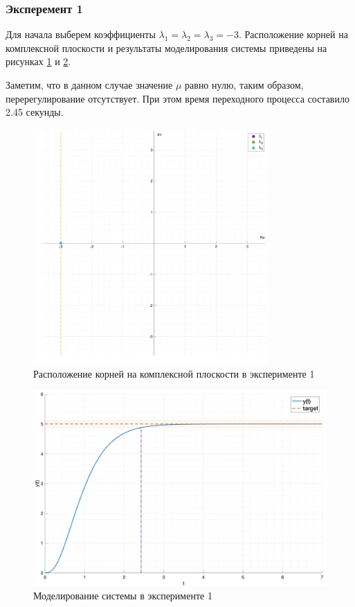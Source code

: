 \subsubsection{Эксперемент 1}
\label{task2_case1}

Для начала выберем коэффициенты $\lambda_1 = \lambda_2 = \lambda_3 = -3$. Расположение корней 
на комплексной плоскости и результаты моделирования системы приведены на 
рисунках \ref{fig:task_2_points1} и \ref{fig:task_2_case1}. 

Заметим, что в данном случае значение $\mu$ равно нулю, таким образом, перерегулирование
отсутствует. При этом время переходного процесса составило 2.45 секунды.

\begin{figure}
    \centering
    \includegraphics[width=0.8\textwidth]{media/plots/task2_points1.png}
    \caption{Расположение корней на комплексной плоскости в эксперименте 1}
    \label{fig:task_2_points1}
\end{figure}

\begin{figure}
    \centering
    \includegraphics[width=\textwidth]{media/plots/task2_case1.png}
    \caption{Моделирование системы в эксперименте 1}
    \label{fig:task_2_case1}
\end{figure}

